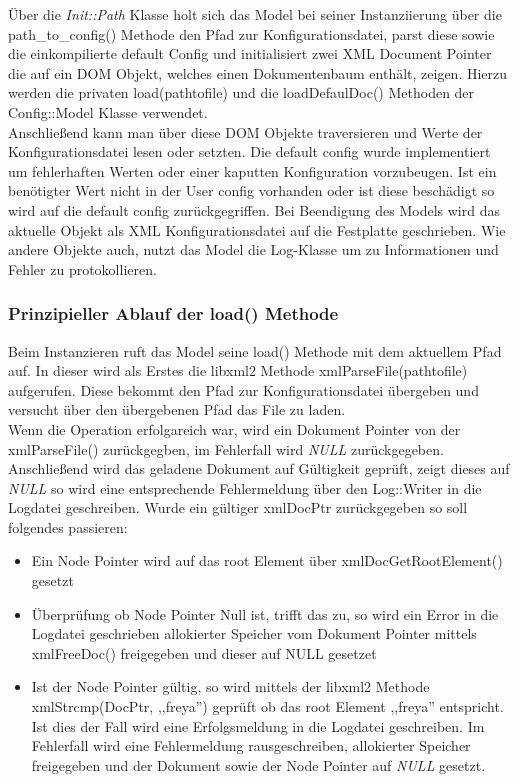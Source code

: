 Über die \emph{Init::Path} Klasse holt sich das Model bei seiner Instanziierung über die path\_to\_config() Methode
den Pfad zur Konfigurationsdatei, parst diese sowie die einkompilierte default Config und 
initialisiert zwei XML Document Pointer die auf ein DOM Objekt, welches einen Dokumentenbaum enthält, zeigen.
Hierzu werden die privaten load(pathtofile) und die loadDefaulDoc() Methoden der Config::Model Klasse verwendet.
\\   

Anschließend kann man über diese DOM Objekte traversieren und Werte der Konfigurationsdatei lesen oder setzten.
Die default config wurde implementiert um fehlerhaften Werten oder einer kaputten Konfiguration vorzubeugen. Ist ein benötigter Wert
nicht in der User config vorhanden oder ist diese beschädigt so wird auf die default config zurückgegriffen.
Bei Beendigung des Models wird das aktuelle Objekt als XML Konfigurationsdatei auf die Festplatte geschrieben.
Wie andere Objekte auch, nutzt das Model die Log-Klasse um zu Informationen und Fehler zu protokollieren.



\subsubsection{Prinzipieller Ablauf der load() Methode}

Beim Instanzieren ruft das Model seine load() Methode mit dem aktuellem Pfad auf.
In dieser wird als Erstes die libxml2 Methode xmlParseFile(pathtofile) aufgerufen. Diese bekommt den
Pfad zur Konfigurationsdatei übergeben und versucht über den übergebenen Pfad das File zu laden.
\\
Wenn die Operation erfolgareich war, wird ein Dokument Pointer von der xmlParseFile() 
zurückgegben, im Fehlerfall wird \emph{NULL} zurückgegeben.
\\
Anschließend wird das geladene Dokument auf Gültigkeit geprüft, zeigt dieses auf \emph{NULL} so wird eine entsprechende Fehlermeldung über den Log::Writer in die Logdatei geschreiben. Wurde ein gültiger xmlDocPtr zurückgegeben so soll folgendes passieren:

\begin{itemize}
    \item Ein Node Pointer wird auf das root Element über xmlDocGetRootElement() gesetzt
    \item Überprüfung ob Node Pointer Null ist, trifft das zu, so wird ein Error in die Logdatei geschrieben
        allokierter Speicher vom Dokument Pointer mittels xmlFreeDoc() freigegeben und dieser auf NULL gesetzet
    \item Ist der Node Pointer gültig, so wird mittels der libxml2 Methode xmlStrcmp(DocPtr, ,,freya'') geprüft ob das
        root Element ,,freya'' entspricht. Ist dies der Fall wird eine Erfolgsmeldung in die Logdatei geschreiben. Im Fehlerfall wird eine Fehlermeldung rausgeschreiben, allokierter Speicher freigegeben
        und der Dokument sowie der Node Pointer auf \emph{NULL} gesetzt. 
\end{itemize}


